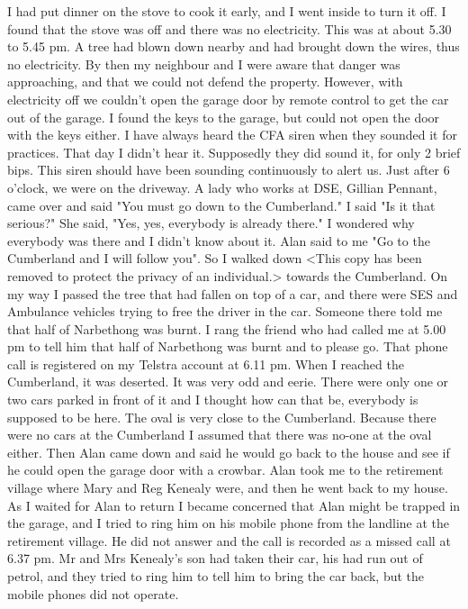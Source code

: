 \documentclass[a4paper]{article}
\begin{document}
    I had put dinner on the stove to cook it early, and I went inside to turn it off. I found that the stove was off and there was no electricity. This was at about 5.30 to 5.45 pm. A tree had blown down nearby and had brought down the wires, thus no electricity.
    By then my neighbour and I were aware that danger was approaching, and that we could not defend the property. However, with electricity off we couldn't open the garage door by remote control to get the car out of the garage. I found the keys to the garage, but could not open the door with the keys either.
    I have always heard the CFA siren when they sounded it for practices. That day I didn't hear it. Supposedly they did sound it, for only 2 brief bips. This siren should have been sounding continuously to alert us.
    Just after 6 o'clock, we were on the driveway. A lady who works at DSE, Gillian Pennant, came over and said "You must go down to the Cumberland." I said "Is it that serious?" She said, "Yes, yes, everybody is already there." I wondered why everybody was there and I didn't know about it. Alan said to me "Go to the Cumberland and I will follow you". So I walked down <This copy has been removed to protect the privacy of an individual.> towards the Cumberland.
    On my way I passed the tree that had fallen on top of a car, and there were SES and Ambulance vehicles trying to free the driver in the car. Someone there told me that half of Narbethong was burnt. I rang the friend who had called me at 5.00 pm to tell him that half of Narbethong was burnt and to please go. That phone call is registered on my Telstra account at 6.11 pm.
    When I reached the Cumberland, it was deserted. It was very odd and eerie. There were only one or two cars parked in front of it and I thought how can that be, everybody is supposed to be here. The oval is very close to the Cumberland. Because there were no cars at the Cumberland I assumed that there was no-one at the oval either. Then Alan came down and said he would go back to the house and see if he could open the garage door with a crowbar.
    Alan took me to the retirement village where Mary and Reg Kenealy were, and then he went back to my house. As I waited for Alan to return I became concerned that Alan might be trapped in the garage, and I tried to ring him on his mobile phone from the landline at the retirement village. He did not answer and the call is recorded as a missed call at 6.37 pm. Mr and Mrs Kenealy's son had taken their car, his had run out of petrol, and they tried to ring him to tell him to bring the car back, but the mobile phones did not operate.
\end{document}
